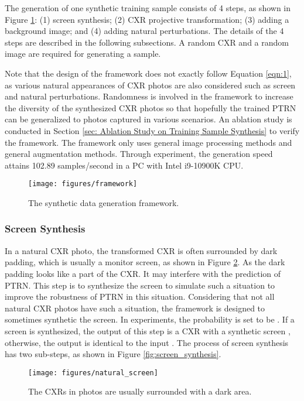 \documentclass[preprint, 12pt]{elsarticle}
\begin{document}
The generation of one synthetic training sample consists of 4 steps, as shown in Figure \ref{fig:framework}: (1) screen synthesis; (2) CXR projective transformation; (3) adding a background image; and (4) adding natural perturbations. The details of the 4 steps are described in the following subsections. A random CXR  and a random image  are required for generating a sample.

Note that the design of the framework does not exactly follow Equation \ref{eqn:1}, as various natural appearances of CXR photos are also considered such as screen and natural perturbations. Randomness is involved in the framework to increase the diversity of the synthesized CXR photos so that hopefully the trained PTRN can be generalized to photos captured in various scenarios. An ablation study is conducted in Section \ref{sec: Ablation Study on Training Sample Synthesis} to verify the framework. The framework only uses general image processing methods and general augmentation methods. Through experiment, the generation speed attains 102.89 samples/second in a PC with Intel i9-10900K CPU.

\begin{figure}
    \centering
    \texttt{[image: figures/framework]}
    \caption{The synthetic data generation framework.}
    \label{fig:framework}
\end{figure}

\subsubsection{Screen Synthesis}

In a natural CXR photo, the transformed CXR is often surrounded by dark padding, which is usually a monitor screen, as shown in Figure \ref{fig:natural_screen}. As the dark padding looks like a part of the CXR. It may interfere with the prediction of PTRN. This step is to synthesize the screen to simulate such a situation to improve the robustness of PTRN in this situation. Considering that not all natural CXR photos have such a situation, the framework is designed to sometimes synthetic the screen. In experiments, the probability is set to be . If a screen is synthesized, the output of this step is a CXR with a synthetic screen , otherwise, the output is identical to the input . The process of screen synthesis has two sub-steps, as shown in Figure \ref{fig:screen_synthesis}.

\begin{figure}
    \centering
    \texttt{[image: figures/natural\_screen]}
    \caption{The CXRs in photos are usually surrounded with a dark area.}
    \label{fig:natural_screen}
\end{figure}
\end{document}
